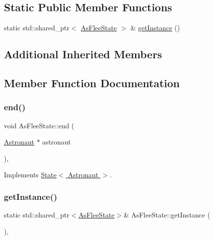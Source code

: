 \subsection*{Static Public Member Functions}
\begin{DoxyCompactItemize}
\item 
static std\+::shared\+\_\+ptr$<$ \hyperlink{class_as_flee_state}{As\+Flee\+State} $>$ \& \hyperlink{class_as_flee_state_ac997349091ed80416dfe2700bae5f726}{get\+Instance} ()
\end{DoxyCompactItemize}
\subsection*{Additional Inherited Members}


\subsection{Member Function Documentation}
\mbox{\label{class_as_flee_state_a58912e7f5eed181065942f81d2e4e22a}} 
\subsubsection{\texorpdfstring{end()}{end()}}
{\footnotesize\ttfamily void As\+Flee\+State\+::end (\begin{DoxyParamCaption}\item[{\hyperlink{class_astronaut}{Astronaut} $\ast$}]{astronaut }\end{DoxyParamCaption})\hspace{0.3cm}{\ttfamily [override]}, {\ttfamily [virtual]}}



Implements \hyperlink{class_state_a97d058722f988c008e912a0e5ec879b3}{State$<$ Astronaut $>$}.

\mbox{\label{class_as_flee_state_ac997349091ed80416dfe2700bae5f726}} 
\subsubsection{\texorpdfstring{get\+Instance()}{getInstance()}}
{\footnotesize\ttfamily static std\+::shared\+\_\+ptr$<$\hyperlink{class_as_flee_state}{As\+Flee\+State}$>$\& As\+Flee\+State\+::get\+Instance (\begin{DoxyParamCaption}{ }\end{DoxyParamCaption})\hspace{0.3cm}{\ttfamily [inline]}, {\ttfamily [static]}}

